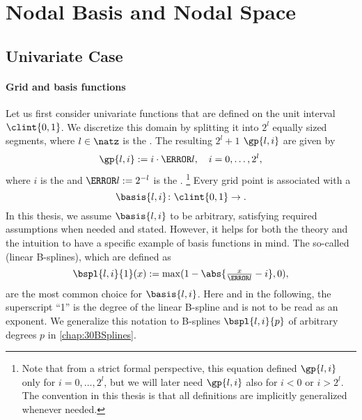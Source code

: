 \section{Nodal Basis and Nodal Space}
\label{sec:21nodalSpaces}



\subsection{Univariate Case}
\label{sec:211nodalUV}

\paragraph{Grid and basis functions}

Let us first consider univariate functions
that are defined on the unit interval $\clint{0, 1}$.
We discretize this domain by splitting it into $2^l$ equally sized segments,
where $l \in \natz$ is the .
The resulting $2^l + 1$  $\gp{l,i}$ are given by
\begin{equation}
  \gp{l,i} := i \cdot \ms{l},\quad
  i = 0, \dotsc, 2^l,
\end{equation}
where $i$ is the  and $\ms{l} := 2^{-l}$ is the .%
\footnote{%
  Note that from a strict formal perspective,
  this equation defined $\gp{l,i}$ only for $i = 0, \dotsc, 2^l$,
  but we will later need $\gp{l,i}$ also for $i < 0$ or $i > 2^l$.
  The convention in this thesis is that all definitions are
  implicitly generalized whenever needed.%
}
Every grid point is associated with a 
\begin{equation}
  \basis{l,i}\colon \clint{0, 1} \to \real.
\end{equation}
In this thesis, we assume $\basis{l,i}$ to be arbitrary,
satisfying required assumptions when needed and stated.
However, it helps for both the theory and the intuition to have a
specific example of basis functions in mind.
The so-called  (linear B-splines), which are defined as
\begin{equation}
  \label{eq:hatFunctionUV}
  \bspl{l,i}{1}(x)
  := \max(1 - \abs{\tfrac{x}{\ms{l}} - i}, 0),
\end{equation}
are the most common choice for $\basis{l,i}$.
Here and in the following,
the superscript ``1'' is the degree of the linear B-spline and
is not to be read as an exponent.
We generalize this notation to B-splines $\bspl{l,i}{p}$ of
arbitrary degrees $p$ in \cref{chap:30BSplines}.

